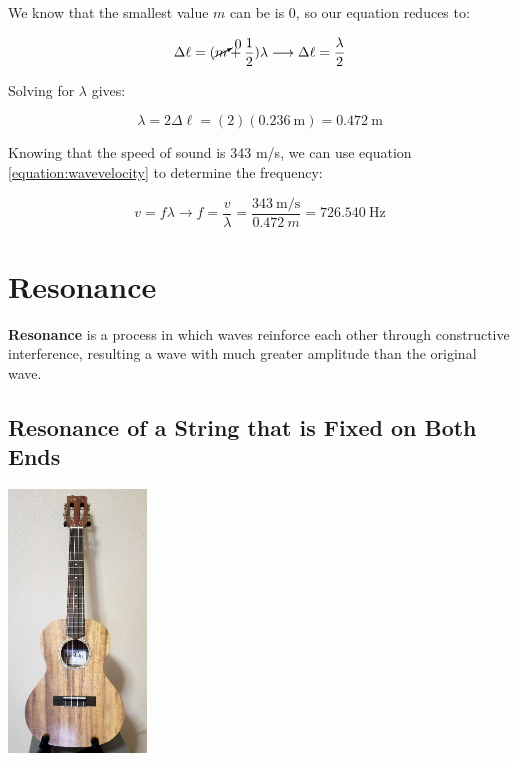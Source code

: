 \begin{mdframed}[backgroundcolor=blue!10!white]
		We know that the smallest value $m$ can be is 0, so our equation reduces to:
				
		\begin{equation*}
		\Delta \ell = (\cancelto{0}{m}+\frac{1}{2}) \lambda \longrightarrow \Delta \ell = \frac{\lambda}{2}
		\end{equation*}
		
		


		Solving for $\lambda$ gives:
		
		
		\begin{equation*}
		\lambda = 2 \Delta \ell = (2)(\SI{0.236}{\m}) = \SI{0.472}{\m}
		\end{equation*}
		
	
		Knowing that the speed of sound is 343 m/s, we can use equation \ref{equation:wavevelocity} to determine the frequency:
		
		\begin{equation*}
		v = f \lambda \longrightarrow f = \frac{v}{\lambda} = \frac{\SI[per-mode = symbol]{343}{\m\per\s}}{\SI{0.472}{m}} = \boxed{\SI{726.540}{\Hz}} 
		\end{equation*}
		

		 
	
		
	\end{mdframed}
	
	
	\section{Resonance}
	\textbf{Resonance} is a process in which waves reinforce each other through constructive interference, resulting a wave with much greater amplitude than the original wave.  
	
		\subsection{Resonance of a String that is Fixed on Both Ends}
		\begin{center}
			\includegraphics[height=2.75in]{Chapters/Ch10-Waves/ukelele.jpg}			
		\end{center}

